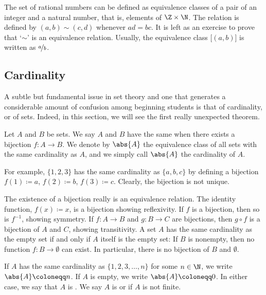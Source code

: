\begin{example} \label{example:ratnums}
The set of rational numbers can be defined as equivalence classes of
a pair of an integer and a natural number,
that is, elements of $\Z \times \N$.  The relation
is defined by $(a,b) \sim (c,d)$ whenever $ad = bc$.
It is left as an exercise to prove that `$\sim$' is an equivalence relation.
Usually, the equivalence class $\bigl[(a,b)\bigr]$ is written as $\nicefrac{a}{b}$.
\end{example}

\subsection{Cardinality}

A subtle but fundamental issue in set theory
and one that generates a considerable amount of
confusion among beginning students is that of cardinality,
or  of sets.
Indeed, in this section, we will see the first really
unexpected theorem.

\begin{defn}
Let $A$ and $B$ be sets.  We say $A$ and $B$ have the same
\emph{}
when there exists a bijection $f \colon A \to B$.  We denote
by $\abs{A}$  the equivalence class of all sets with the same cardinality as
$A$, and we simply call $\abs{A}$ the cardinality of $A$.
\end{defn}

For example, $\{ 1,2,3 \}$ has the same cardinality as $\{ a,b,c \}$ by
defining a bijection $f(1) \coloneqq a$, $f(2) \coloneqq b$, $f(3) \coloneqq c$.
Clearly, the bijection is not unique.

The existence of a bijection really is an equivalence relation.
The identity function, $f(x) \coloneqq x$, is a bijection showing reflexivity.
If $f$ is a bijection, then so is $f^{-1}$, showing symmetry.
If $f \colon A \to B$ and $g \colon B \to C$ are bijections, then
$g \circ f$ is a bijection of $A$ and $C$, showing transitivity.
A set $A$ has the same cardinality as the empty set if and only
if $A$ itself is the empty set:  If $B$ is nonempty, then
no function $f \colon B \to \emptyset$ can exist.
In particular, there is no bijection of $B$ and $\emptyset$.

\begin{defn}
If $A$ has the same cardinality as $\{ 1,2,3,\ldots,n \}$
for some $n \in \N$,
we write $\abs{A} \coloneqq n$.  If $A$ is empty, we write
$\abs{A} \coloneqq 0$.
In either case, we say that $A$ is
\emph{}.
We say $A$ is \emph{} or 
if $A$ is not finite.
\end{defn}

